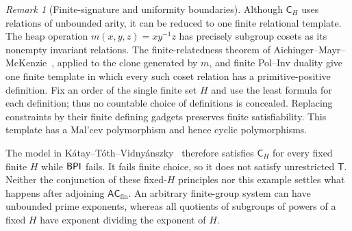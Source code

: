 \documentclass[11pt,a4paper]{article}
\theoremstyle{definition}\newtheorem{definition}[theorem]{Definition}
\theoremstyle{remark}\newtheorem{remark}[theorem]{Remark}
\newcommand{\ACfin}{\mathsf{AC}_{\mathrm{fin}}}
\begin{document}
\begin{remark}[Finite-signature and uniformity boundaries]
Although $\mathsf C_H$ uses relations of unbounded arity, it can be reduced to one finite relational template. The heap operation $m(x,y,z)=xy^{-1}z$ has precisely subgroup cosets as its nonempty invariant relations. The finite-relatedness theorem of Aichinger--Mayr--McKenzie~\cite{AMM}, applied to the clone generated by $m$, and finite Pol--Inv duality give one finite template in which every such coset relation has a primitive-positive definition. Fix an order of the single finite set $H$ and use the least formula for each definition; thus no countable choice of definitions is concealed. Replacing constraints by their finite defining gadgets preserves finite satisfiability. This template has a Mal'cev polymorphism and hence cyclic polymorphisms.

The model in K\'atay--T\'oth--Vidny\'anszky~\cite[Theorem~1.2]{KTV} therefore satisfies $\mathsf C_H$ for every fixed finite $H$ while $\mathsf{BPI}$ fails. It fails finite choice, so it does not satisfy unrestricted $\mathsf T$. Neither the conjunction of these fixed-$H$ principles nor this example settles what happens after adjoining $\ACfin$. An arbitrary finite-group system can have unbounded prime exponents, whereas all quotients of subgroups of powers of a fixed $H$ have exponent dividing the exponent of $H$.
\end{remark}
\end{document}
